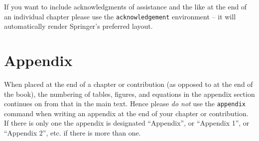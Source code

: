 \documentclass[graybox,envcountchap,sectrefs%
,footinfo
]{svmono}
\begin{document}
\begin{acknowledgement}
If you want to include acknowledgments of assistance and the like at the end of an individual chapter please use the \verb|acknowledgement| environment -- it will automatically render Springer's preferred layout.
\end{acknowledgement}
%
\section*{Appendix}
%
When placed at the end of a chapter or contribution (as opposed to at the end of the book), the numbering of tables, figures, and equations in the appendix section continues on from that in the main text. Hence please \textit{do not} use the \verb|appendix| command when writing an appendix at the end of your chapter or contribution. If there is only one the appendix is designated ``Appendix'', or ``Appendix 1'', or ``Appendix 2'', etc. if there is more than one.

\end{document}
